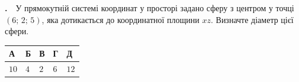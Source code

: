 \documentclass[12pt]{article}
\newlength{\nmtcellw}
\newcommand{\nmtSetCell}{\setlength{\nmtcellw}{\dimexpr(\linewidth-10\tabcolsep-6\arrayrulewidth)/5\relax}}
\newcommand{\answerTable}[5]{%
\par\nopagebreak\vspace{0.15cm}
\noindent\nmtSetCell
\begin{tabular}{|*{5}{>{\centering\arraybackslash}m{\nmtcellw}|}}
\hline
\rule[-0.15cm]{0pt}{0.6cm}\textbf{А} & \rule[-0.15cm]{0pt}{0.6cm}\textbf{Б} & \rule[-0.15cm]{0pt}{0.6cm}\textbf{В} & \rule[-0.15cm]{0pt}{0.6cm}\textbf{Г} & \rule[-0.15cm]{0pt}{0.6cm}\textbf{Д} \\
\hline
\rule[-0.2cm]{0pt}{0.75cm}#1 & \rule[-0.2cm]{0pt}{0.75cm}#2 & \rule[-0.2cm]{0pt}{0.75cm}#3 & \rule[-0.2cm]{0pt}{0.75cm}#4 & \rule[-0.2cm]{0pt}{0.75cm}#5 \\
\hline
\end{tabular}
\par\vspace{0.25cm}
}
\newcommand{\matchingGrid}{%
    \sbox{\nmtgridbox}{\matchingGridRaw}%
    \ifdim\wd\nmtgridbox>\linewidth \resizebox{\linewidth}{!}{\usebox{\nmtgridbox}}\else\usebox{\nmtgridbox}\fi}
\newcommand{\matchingGridRaw}{%
    \begingroup
    \renewcommand{\arraystretch}{1.15}
    \setlength{\tabcolsep}{4pt}
    \footnotesize
    \begin{tabular}{r|c|c|c|c|c|}
         \multicolumn{1}{c}{} & \multicolumn{1}{c}{\textbf{А}} & \multicolumn{1}{c}{\textbf{Б}} & \multicolumn{1}{c}{\textbf{В}} & \multicolumn{1}{c}{\textbf{Г}} & \multicolumn{1}{c}{\textbf{Д}} \\ \cline{2-6}
         \textbf{1} & \phantom{X} & \phantom{X} & \phantom{X} & \phantom{X} & \phantom{X} \\ \cline{2-6}
         \textbf{2} & & & & & \\ \cline{2-6}
         \textbf{3} & & & & & \\ \cline{2-6}
    \end{tabular}
    \endgroup
}
\newcounter{zad}
\newcommand{\zadtask}[1]{\stepcounter{zad}\noindent\textbf{\thezad.}\ \ #1\par\nopagebreak\vspace{0.2cm}}
\newcounter{ans}
\begin{document}
\providecommand{\trigStyle}[1]{#1}
\providecommand{\answerTableSmall}[5]{%
\begingroup\setlength{\tabcolsep}{2pt}\small\nmtSetCell
\begin{tabular}{|*{5}{>{\centering\arraybackslash}m{\nmtcellw}|}}
\hline
\rule[-0.2cm]{0pt}{0.6cm}\textbf{А} & \textbf{Б} & \textbf{В} & \textbf{Г} & \textbf{Д} \\
\hline
\rule[-0.4cm]{0pt}{0.9cm}#1 & \rule[-0.4cm]{0pt}{0.9cm}#2 & \rule[-0.4cm]{0pt}{0.9cm}#3 & \rule[-0.4cm]{0pt}{0.9cm}#4 & \rule[-0.4cm]{0pt}{0.9cm}#5 \\
\hline
\end{tabular}\endgroup}
\providecommand{\matchingLayout}[3]{%
    \noindent
    \begin{minipage}[t]{0.36\textwidth}\vspace{0pt}\raggedright
        #1
    \end{minipage}%
    \hfill
    \begin{minipage}[t]{0.43\textwidth}\vspace{0pt}\raggedright
        #2
    \end{minipage}%
    \hfill
    \begin{minipage}[t]{0.19\textwidth}
        \vspace{0pt}
        \begin{flushright}
        #3
        \end{flushright}
    \end{minipage}}
\providecommand{\matchingLayoutBottom}[2]{%
    \noindent
    \begin{minipage}[t]{0.48\textwidth}\vspace{0pt}\raggedright
        #1
    \end{minipage}%
    \hfill
    \begin{minipage}[t]{0.48\textwidth}\vspace{0pt}\raggedright
        #2
    \end{minipage}
    \vspace{0.5cm}
    \noindent
    \matchingGrid}
\providecommand{\answerListVertical}[5]{%
    \par\nopagebreak\vspace{0.2cm}
    \begin{itemize}[itemsep=0.4cm, leftmargin=1.5cm, labelsep=0.5cm]
        \item[\textbf{А}] #1
        \item[\textbf{Б}] #2
        \item[\textbf{В}] #3
        \item[\textbf{Г}] #4
        \item[\textbf{Д}] #5
    \end{itemize}
    \vspace{0.2cm}}
\begin{samepage}
\zadtask{У прямокутній системі координат у просторі задано сферу з центром у точці $(6;\, 2;\, 5)$, яка дотикається до координатної площини $xz$. Визначте діаметр цієї сфери.}
\answerTable{$10$}{$4$}{$2$}{$6$}{$12$}
\par{}
\end{samepage}
\endgroup
\end{document}
